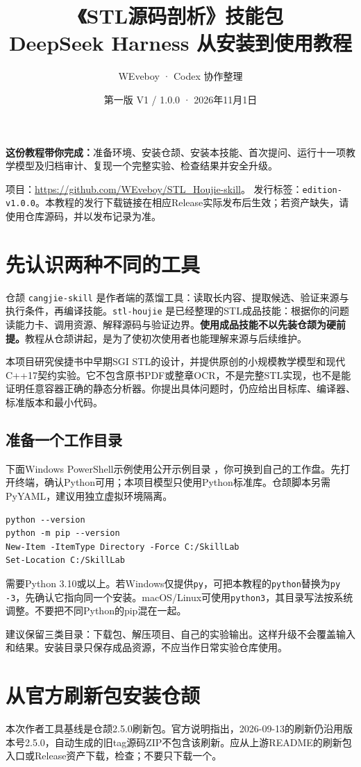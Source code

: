 \documentclass[11pt,a4paper,fontset=fandol]{ctexart}
\title{《STL源码剖析》技能包\\DeepSeek Harness 从安装到使用教程}
\author{WEveboy · Codex 协作整理}
\date{第一版 V1 / 1.0.0 · 2026年11月1日}
\begin{document}
\maketitle
\noindent\textbf{这份教程带你完成：}准备环境、安装仓颉、安装本技能、首次提问、运行十一项教学模型及归档审计、复现一个完整实验、检查结果并安全升级。

\noindent 项目：\url{https://github.com/WEveboy/STL_Houjie-skill}。
发行标签：\texttt{edition-v1.0.0}。本教程的发行下载链接在相应Release实际发布后生效；若资产缺失，请使用仓库源码，并以发布记录为准。
{\small\setlength{\parskip}{0pt}\tableofcontents}
\newpage
\section{先认识两种不同的工具}
仓颉 \texttt{cangjie-skill} 是作者端的蒸馏工具：读取长内容、提取候选、验证来源与执行条件，再编译技能。\texttt{stl-houjie} 是已经整理的STL成品技能：根据你的问题读能力卡、调用资源、解释源码与验证边界。\textbf{使用成品技能不以先装仓颉为硬前提。}教程从仓颉讲起，是为了使初次使用者也能理解来源与后续维护。

本项目研究侯捷书中早期SGI STL的设计，并提供原创的小规模教学模型和现代C++17契约实验。它不包含原书PDF或整章OCR，不是完整STL实现，也不是能证明任意容器正确的静态分析器。你提出具体问题时，仍应给出目标库、编译器、标准版本和最小代码。

\subsection{准备一个工作目录}
下面Windows PowerShell示例使用公开示例目录 ，你可换到自己的工作盘。先打开终端，确认Python可用；本项目模型只使用Python标准库。仓颉脚本另需PyYAML，建议用独立虚拟环境隔离。
\begin{lstlisting}
python --version
python -m pip --version
New-Item -ItemType Directory -Force C:/SkillLab
Set-Location C:/SkillLab
\end{lstlisting}
需要Python 3.10或以上。若Windows仅提供\texttt{py}，可把本教程的\texttt{python}替换为\texttt{py -3}，先确认它指向同一个安装。macOS/Linux可使用\texttt{python3}，其目录写法按系统调整。不要把不同Python的pip混在一起。

建议保留三类目录：下载包、解压项目、自己的实验输出。这样升级不会覆盖输入和结果。安装目录只保存成品资源，不应当作日常实验仓库使用。
\section{从官方刷新包安装仓颉}
本次作者工具基线是仓颉2.5.0刷新包。官方说明指出，2026-09-13的刷新仍沿用版本号2.5.0，自动生成的旧tag源码ZIP不包含该刷新。应从上游README的刷新包入口或Release资产下载，检查；不要只下载一个。
\end{document}
